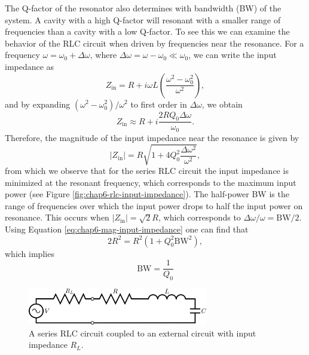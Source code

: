 The Q-factor of the resonator also determines with bandwidth (BW) of the system. A cavity with a high Q-factor will resonant with a smaller range of frequencies than a cavity with a low Q-factor. To see this we can examine the behavior of the RLC circuit when driven by frequencies near the resonance. For a frequency $\omega=\omega_0+\Delta \omega$, where $\Delta \omega=\omega-\omega_0\ll \omega_0$, we can write the input impedance as 
\begin{equation}
    Z_\mathrm{in}=R+i\omega L\left(\frac{\omega^2-\omega_0^2}{\omega^2}\right),
\end{equation}
and by expanding $(\omega^2-\omega_0^2)/\omega^2$ to first order in $\Delta\omega$, we obtain 
\begin{equation}
    Z_\mathrm{in}\approx R+i\frac{2RQ_0\Delta\omega}{\omega_0}.
\end{equation}
Therefore, the magnitude of the input impedance near the resonance is given by 
\begin{equation}
    |Z_\mathrm{in}|=R\sqrt{1+4Q_0^2\frac{\Delta\omega^2}{\omega^2}}, 
    \label{eq:chap6-mag-input-impedance}
\end{equation}
from which we observe that for the series RLC circuit the input impedance is minimized at the resonant frequency, which corresponds to the maximum input power (see Figure \ref{fig:chap6-rlc-input-impedance}). The half-power BW is the range of frequencies over which the input power drops to half the input power on resonance. This occurs when $|Z_\mathrm{in}|=\sqrt{2}R$, which corresponds to $\Delta\omega/\omega=\textrm{BW}/2$. Using Equation \ref{eq:chap6-mag-input-impedance} one can find that
\begin{equation}
    2R^2=R^2(1+Q_0^2\mathrm{BW}^2),
\end{equation}
which implies
\begin{equation}
    \mathrm{BW}=\frac{1}{Q_0}
\end{equation}

\begin{figure}[htbp]
    \centering
    \includegraphics*[width=0.7\textwidth]{figs/Chapter-6/230607_loaded_rlc.png}
    \caption{\label{fig:chap6-loaded-resonator-circuit} A series RLC circuit coupled to an external circuit with input impedance $R_L$.}
\end{figure}

